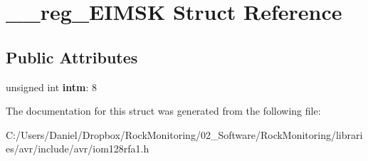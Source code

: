 \hypertarget{struct____reg___e_i_m_s_k}{}\section{\+\_\+\+\_\+reg\+\_\+\+E\+I\+M\+SK Struct Reference}
\label{struct____reg___e_i_m_s_k}
\subsection*{Public Attributes}
\begin{DoxyCompactItemize}
\item 
unsigned int {\bfseries intm}\+: 8\hypertarget{struct____reg___e_i_m_s_k_a6544d0e2fba2b346dee4629a55e45f10}{}\label{struct____reg___e_i_m_s_k_a6544d0e2fba2b346dee4629a55e45f10}

\end{DoxyCompactItemize}


The documentation for this struct was generated from the following file\+:\begin{DoxyCompactItemize}
\item 
C\+:/\+Users/\+Daniel/\+Dropbox/\+Rock\+Monitoring/02\+\_\+\+Software/\+Rock\+Monitoring/libraries/avr/include/avr/iom128rfa1.\+h\end{DoxyCompactItemize}
